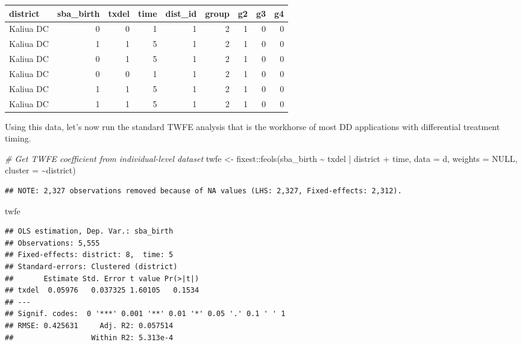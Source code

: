 \documentclass[
]{article}
\newenvironment{Shaded}{\begin{snugshade}}{\end{snugshade}}
\newcommand{\AttributeTok}[1]{\textcolor[rgb]{0.77,0.63,0.00}{#1}}
\newcommand{\CommentTok}[1]{\textcolor[rgb]{0.56,0.35,0.01}{\textit{#1}}}
\newcommand{\ConstantTok}[1]{\textcolor[rgb]{0.00,0.00,0.00}{#1}}
\newcommand{\FunctionTok}[1]{\textcolor[rgb]{0.00,0.00,0.00}{#1}}
\newcommand{\NormalTok}[1]{#1}
\newcommand{\OtherTok}[1]{\textcolor[rgb]{0.56,0.35,0.01}{#1}}
\newcommand{\SpecialCharTok}[1]{\textcolor[rgb]{0.00,0.00,0.00}{#1}}
\begin{document}
\begin{table}
\centering
\begin{tabular}{l|r|r|r|r|r|r|r|r}
\hline
district & sba\_birth & txdel & time & dist\_id & group & g2 & g3 & g4\\
\hline
Kaliua DC & 0 & 0 & 1 & 1 & 2 & 1 & 0 & 0\\
\hline
Kaliua DC & 1 & 1 & 5 & 1 & 2 & 1 & 0 & 0\\
\hline
Kaliua DC & 0 & 1 & 5 & 1 & 2 & 1 & 0 & 0\\
\hline
Kaliua DC & 0 & 0 & 1 & 1 & 2 & 1 & 0 & 0\\
\hline
Kaliua DC & 1 & 1 & 5 & 1 & 2 & 1 & 0 & 0\\
\hline
Kaliua DC & 1 & 1 & 5 & 1 & 2 & 1 & 0 & 0\\
\hline
\end{tabular}
\end{table}

Using this data, let's now run the standard TWFE analysis that is the
workhorse of most DD applications with differential treatment timing.

\begin{Shaded}
\begin{Highlighting}[]
\CommentTok{\# Get TWFE coefficient from individual{-}level dataset}
\NormalTok{twfe }\OtherTok{\textless{}{-}}\NormalTok{ fixest}\SpecialCharTok{::}\FunctionTok{feols}\NormalTok{(sba\_birth }\SpecialCharTok{\textasciitilde{}}\NormalTok{ txdel }\SpecialCharTok{|}\NormalTok{ district }\SpecialCharTok{+}\NormalTok{ time, }
                      \AttributeTok{data =}\NormalTok{ d,}
                      \AttributeTok{weights =} \ConstantTok{NULL}\NormalTok{, }
                      \AttributeTok{cluster =} \SpecialCharTok{\textasciitilde{}}\NormalTok{district)}
\end{Highlighting}
\end{Shaded}

\begin{verbatim}
## NOTE: 2,327 observations removed because of NA values (LHS: 2,327, Fixed-effects: 2,312).
\end{verbatim}

\begin{Shaded}
\begin{Highlighting}[]
\NormalTok{twfe}
\end{Highlighting}
\end{Shaded}

\begin{verbatim}
## OLS estimation, Dep. Var.: sba_birth
## Observations: 5,555 
## Fixed-effects: district: 8,  time: 5
## Standard-errors: Clustered (district) 
##       Estimate Std. Error t value Pr(>|t|) 
## txdel  0.05976   0.037325 1.60105   0.1534 
## ---
## Signif. codes:  0 '***' 0.001 '**' 0.01 '*' 0.05 '.' 0.1 ' ' 1
## RMSE: 0.425631     Adj. R2: 0.057514
##                  Within R2: 5.313e-4
\end{verbatim}
\end{document}
